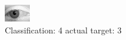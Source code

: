 \begin{figure}[h!]
\begin{center}
\includegraphics[width=0.60\columnwidth]{figures/ID2850_class_4_target_3.png}
\end{center}
\caption{ Classification: 4 actual target: 3}
\label{fig:ID2850_class_4_target_3}
\end{figure}
